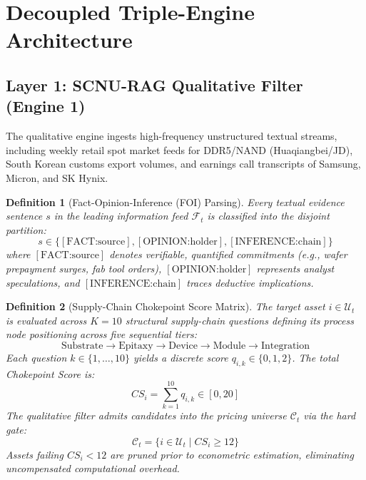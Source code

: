 \documentclass[journal,10pt,twocolumn]{IEEEtran}
\newtheorem{definition}{Definition}
\begin{document}
\section{Decoupled Triple-Engine Architecture}

\subsection{Layer 1: SCNU-RAG Qualitative Filter (Engine 1)}
The qualitative engine ingests high-frequency unstructured textual streams, including weekly retail spot market feeds for DDR5/NAND (Huaqiangbei/JD), South Korean customs export volumes, and earnings call transcripts of Samsung, Micron, and SK Hynix.

\begin{definition}[Fact-Opinion-Inference (FOI) Parsing]
Every textual evidence sentence $s$ in the leading information feed $\mathcal{F}_t$ is classified into the disjoint partition:
\begin{equation}
s \in \{[\text{FACT:source}], [\text{OPINION:holder}], [\text{INFERENCE:chain}]\}
\end{equation}
where $[\text{FACT:source}]$ denotes verifiable, quantified commitments (e.g., wafer prepayment surges, fab tool orders), $[\text{OPINION:holder}]$ represents analyst speculations, and $[\text{INFERENCE:chain}]$ traces deductive implications.
\end{definition}

\begin{definition}[Supply-Chain Chokepoint Score Matrix]
The target asset $i \in \mathcal{U}_t$ is evaluated across $K=10$ structural supply-chain questions defining its process node positioning across five sequential tiers:
\begin{equation}
\text{Substrate} \to \text{Epitaxy} \to \text{Device} \to \text{Module} \to \text{Integration}
\end{equation}
Each question $k \in \{1,\dots,10\}$ yields a discrete score $q_{i,k} \in \{0, 1, 2\}$. The total Chokepoint Score is:
\begin{equation}
CS_i = \sum_{k=1}^{10} q_{i,k} \in [0, 20]
\end{equation}
The qualitative filter admits candidates into the pricing universe $\mathcal{C}_t$ via the hard gate:
\begin{equation}
\mathcal{C}_t = \{i \in \mathcal{U}_t \mid CS_i \ge 12\}
\end{equation}
Assets failing $CS_i < 12$ are pruned prior to econometric estimation, eliminating uncompensated computational overhead.
\end{definition}
\end{document}
